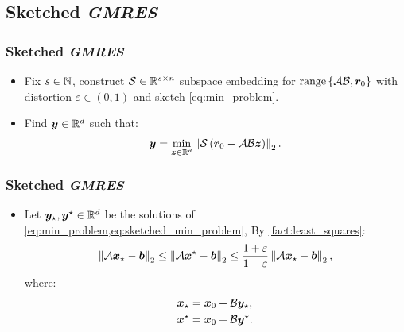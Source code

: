 \subsection{Sketched \textit{GMRES}}

\begin{frame}
    \frametitle{Sketched \textit{GMRES}}

    \begin{itemize}
        \item Fix $s \in \mathbb{N}$, construct $\mathcal{S} \in \mathbb{R}^{s \times n}$ subspace embedding for $\operatorname*{range}\left\{\mathcal{A} \mathcal{B}, \bm{r}_0\right\}$ with distortion $\varepsilon \in \left(0, 1\right)$ and sketch \cref{eq:min_problem}.

        \item Find $\bm{y} \in \mathbb{R}^{d}$ such that:
        \begin{align}
            \bm{y} = \min_{\bm{z} \in \mathbb{R}^{d}} \left\lVert  \mathcal{S} \left( \bm{r}_0 - \mathcal{A} \mathcal{B} \bm{z} \right) \right\rVert_2. \label{eq:sketched_min_problem}
        \end{align}
    \end{itemize}
    
\end{frame}

\begin{frame}
    \frametitle{Sketched \textit{GMRES}}

    \begin{itemize}
        \item Let $\bm{y}_{\star}, \bm{y}^{\star} \in \mathbb{R}^{d}$ be the solutions of \cref{eq:min_problem,eq:sketched_min_problem}, By \cref{fact:least_squares}:
        \begin{align}
            \left\lVert \mathcal{A} \bm{x}_{\star} - \bm{b} \right\rVert_2 \leq \left\lVert \mathcal{A} \bm{x}^{\star} - \bm{b} \right\rVert_2 \leq \frac{1 + \varepsilon}{1 - \varepsilon} \left\lVert \mathcal{A} \bm{x}_{\star} - \bm{b} \right\rVert_2, \label{eq:sketched_gmres_estimate}
        \end{align}
        where:
        \begin{align}
            \bm{x}_{\star} &= \bm{x}_0 + \mathcal{B} \bm{y}_{\star}, \\
            \bm{x}^{\star} &= \bm{x}_0 + \mathcal{B} \bm{y}^{\star}.
        \end{align}
    \end{itemize}

\end{frame}